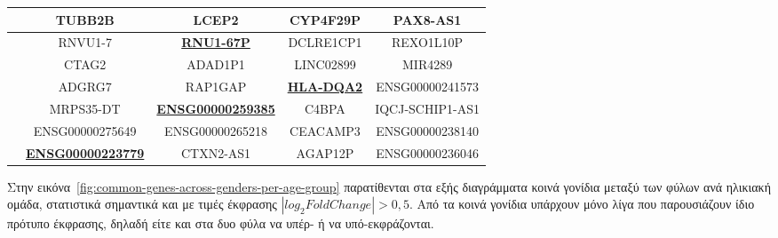 \documentclass[12pt]{report}
\begin{document}
\begin{table}[ht]
\begin{tabular}{@{}>{\raggedright}p{1.3cm}cccc@{}}
                        & \cellcolor{blue!20}TUBB2B & \cellcolor{red!20}LCEP2 & \cellcolor{blue!20}CYP4F29P & \cellcolor{blue!20}PAX8-AS1 \\
                        \midrule
                        \multirow{6}{*}{Γυναίκες}
                        & \cellcolor{red!20}RNVU1-7 & \cellcolor{blue!20}\textbf{\underline{RNU1-67P}} & \cellcolor{blue!20}DCLRE1CP1 & \cellcolor{red!20}REXO1L10P \\
                        & \cellcolor{red!20}CTAG2 & \cellcolor{red!20}ADAD1P1 & \cellcolor{blue!20}LINC02899 & \cellcolor{red!20}MIR4289 \\
                        & \cellcolor{red!20}ADGRG7 & \cellcolor{blue!20}RAP1GAP & \cellcolor{blue!20}\textbf{\underline{HLA-DQA2}} & \cellcolor{red!20}ENSG00000241573 \\
                        & \cellcolor{red!20}MRPS35-DT & \cellcolor{blue!20}\textbf{\underline{ENSG00000259385}} & \cellcolor{red!20}C4BPA & \cellcolor{red!20}IQCJ-SCHIP1-AS1 \\
                        & \cellcolor{red!20}ENSG00000275649 & \cellcolor{blue!20}ENSG00000265218 & \cellcolor{blue!20}CEACAMP3 & \cellcolor{red!20}ENSG00000238140 \\
                        & \cellcolor{red!20}\textbf{\underline{ENSG00000223779}} & \cellcolor{blue!20}CTXN2-AS1 & \cellcolor{blue!20}AGAP12P & \cellcolor{red!20}ENSG00000236046 \\
                        
                        \bottomrule
                    \end{tabular}
                    \label{tab:top-6-degs-strata}
                \end{table}
                \par
                    Στην εικόνα~\ref{fig:common-genes-across-genders-per-age-group} παρατίθενται στα εξής διαγράμματα κοινά γονίδια μεταξύ των φύλων ανά ηλικιακή ομάδα, στατιστικά σημαντικά και με τιμές έκφρασης $|log_2FoldChange| > 0,5$. Από τα κοινά γονίδια υπάρχουν μόνο λίγα που παρουσιάζουν ίδιο πρότυπο έκφρασης, δηλαδή είτε και στα δυο φύλα να υπέρ- ή να υπό-εκφράζονται.
\end{document}

